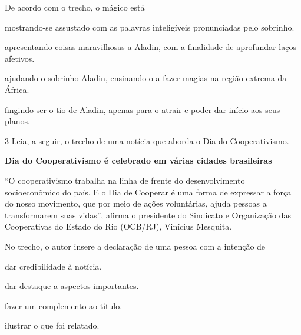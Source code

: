 \begin{myquote}
\begin{myescolha}
De acordo com o trecho, o mágico está

\begin{escolha}
\item mostrando-se assustado com as palavras inteligíveis pronunciadas pelo sobrinho.

\item apresentando coisas maravilhosas a Aladin, com a finalidade de aprofundar laços afetivos.

\item ajudando o sobrinho Aladin, ensinando-o a fazer magias na região extrema da África.

\item fingindo ser o tio de Aladin, apenas para o atrair e poder dar início aos seus planos.
\end{escolha}


\num{3} Leia, a seguir, o trecho de uma notícia que aborda o Dia do
Cooperativismo.

\begin{myquote}
\textbf{Dia do Cooperativismo é celebrado em várias cidades brasileiras}

``O cooperativismo trabalha na linha de frente do
desenvolvimento socioeconômico do país. E o Dia de Cooperar é uma forma
de expressar a força do nosso movimento, que por meio de ações
voluntárias, ajuda pessoas a transformarem suas vidas'', afirma o
presidente do Sindicato e Organização das Cooperativas do Estado do Rio
(OCB/RJ), Vinícius Mesquita.

\end{myquote}

No trecho, o autor insere a declaração de uma pessoa com a intenção de

\begin{escolha}
\item dar credibilidade à notícia.

\item dar destaque a aspectos importantes.

\item fazer um complemento ao título.

\item ilustrar o que foi relatado.
\end{escolha}


\end{myescolha}
\end{myquote}
